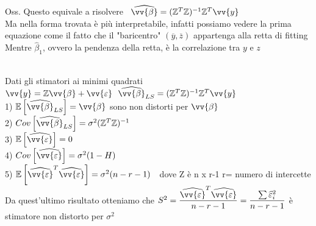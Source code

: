 Oss. Questo equivale a risolvere \ $\hat{\vv{\beta}}= (\ZZ^T\ZZ)^{-1}\ZZ^T\vv{y}$\\
Ma nella forma trovata è più interpretabile, infatti possiamo vedere la prima equazione come il fatto che il "baricentro" $(\overline{y},\overline{z})$ appartenga alla retta di fitting \\
Mentre $\hat{\beta}_1$, ovvero la pendenza della retta, è la correlazione tra $y$ e $z$\\ \\



\begin{teo}
    Dati gli stimatori ai minimi quadrati \ $\vv{y} = \ZZ \vv{\beta} + \vv{\eps} \ \ \hat{\vv{\beta}}_{LS} = (\ZZ^T\ZZ)^{-1} \ZZ^T \vv{y}$\\
    1) $\E{\hat{\vv{\beta}}_{LS}}=\vv{\beta}$ sono non distorti per $\vv{\beta}$\smallskip\\
    2) $Cov\OO\hat{\vv{\beta}}_{LS}\CC=\sigma^2(\ZZ^T\ZZ)^{-1}$\smallskip\\
    3) $\E{\hat{\vv{\eps}}}=0$\smallskip\\
    4) $Cov\OO\hat{\vv{\eps}}\CC=\sigma^2(1-H)$\smallskip\\
    5) $\E{\hat{\vv{\eps}}^T\hat{\vv{\eps}}} = \sigma^2(n-r-1)$\ \
    dove Z è n x r-1  r= numero di intercette\\
    Da quest'ultimo risultato otteniamo che $S^2=\frac{\hat{\vv{\eps}}^T\hat{\vv{\eps}}}{n-r-1} = \frac{\sum \hat{\eps}_i^2}{n-r-1}$ è stimatore non distorto per $\sigma^2$
\end{teo}

